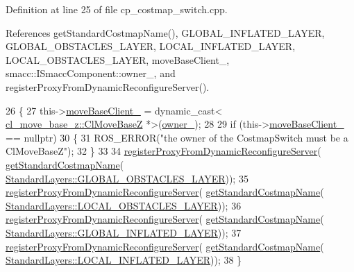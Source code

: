 Definition at line 25 of file cp\+\_\+costmap\+\_\+switch.\+cpp.



References get\+Standard\+Costmap\+Name(), G\+L\+O\+B\+A\+L\+\_\+\+I\+N\+F\+L\+A\+T\+E\+D\+\_\+\+L\+A\+Y\+ER, G\+L\+O\+B\+A\+L\+\_\+\+O\+B\+S\+T\+A\+C\+L\+E\+S\+\_\+\+L\+A\+Y\+ER, L\+O\+C\+A\+L\+\_\+\+I\+N\+F\+L\+A\+T\+E\+D\+\_\+\+L\+A\+Y\+ER, L\+O\+C\+A\+L\+\_\+\+O\+B\+S\+T\+A\+C\+L\+E\+S\+\_\+\+L\+A\+Y\+ER, move\+Base\+Client\+\_\+, smacc\+::\+I\+Smacc\+Component\+::owner\+\_\+, and register\+Proxy\+From\+Dynamic\+Reconfigure\+Server().


\begin{DoxyCode}
26 \{
27     this->\hyperlink{classcl__move__base__z_1_1CostmapSwitch_acf03e8e1bb0ce2117b1a081ed0d073dd}{moveBaseClient\_} = \textcolor{keyword}{dynamic\_cast<}
      \hyperlink{classcl__move__base__z_1_1ClMoveBaseZ}{cl\_move\_base\_z::ClMoveBaseZ} *\textcolor{keyword}{>}(\hyperlink{classsmacc_1_1ISmaccComponent_a909590e672450ce0eb0d8facb45c737a}{owner\_});
28 
29     \textcolor{keywordflow}{if} (this->\hyperlink{classcl__move__base__z_1_1CostmapSwitch_acf03e8e1bb0ce2117b1a081ed0d073dd}{moveBaseClient\_} == \textcolor{keyword}{nullptr})
30     \{
31         ROS\_ERROR(\textcolor{stringliteral}{"the owner of the CostmapSwitch must be a ClMoveBaseZ"});
32     \}
33 
34     \hyperlink{classcl__move__base__z_1_1CostmapSwitch_a0d04ca7b655f850ba3107393f1c437cb}{registerProxyFromDynamicReconfigureServer}(
      \hyperlink{classcl__move__base__z_1_1CostmapSwitch_ac46796874242fdaa7efef86b66a55102}{getStandardCostmapName}(
      \hyperlink{classcl__move__base__z_1_1CostmapSwitch_af38aeee5e3893e689cd74ddddfe0df15a94404229e09ab748aab0096bd5ff3656}{StandardLayers::GLOBAL\_OBSTACLES\_LAYER}));
35     \hyperlink{classcl__move__base__z_1_1CostmapSwitch_a0d04ca7b655f850ba3107393f1c437cb}{registerProxyFromDynamicReconfigureServer}(
      \hyperlink{classcl__move__base__z_1_1CostmapSwitch_ac46796874242fdaa7efef86b66a55102}{getStandardCostmapName}(
      \hyperlink{classcl__move__base__z_1_1CostmapSwitch_af38aeee5e3893e689cd74ddddfe0df15aff8d30cf6ceac8551691e28c328aebe6}{StandardLayers::LOCAL\_OBSTACLES\_LAYER}));
36     \hyperlink{classcl__move__base__z_1_1CostmapSwitch_a0d04ca7b655f850ba3107393f1c437cb}{registerProxyFromDynamicReconfigureServer}(
      \hyperlink{classcl__move__base__z_1_1CostmapSwitch_ac46796874242fdaa7efef86b66a55102}{getStandardCostmapName}(
      \hyperlink{classcl__move__base__z_1_1CostmapSwitch_af38aeee5e3893e689cd74ddddfe0df15a1757575ee674622adfb325de182a65d6}{StandardLayers::GLOBAL\_INFLATED\_LAYER}));
37     \hyperlink{classcl__move__base__z_1_1CostmapSwitch_a0d04ca7b655f850ba3107393f1c437cb}{registerProxyFromDynamicReconfigureServer}(
      \hyperlink{classcl__move__base__z_1_1CostmapSwitch_ac46796874242fdaa7efef86b66a55102}{getStandardCostmapName}(
      \hyperlink{classcl__move__base__z_1_1CostmapSwitch_af38aeee5e3893e689cd74ddddfe0df15aab9e94e9dc4c62e74e48ee34b11c8807}{StandardLayers::LOCAL\_INFLATED\_LAYER}));
38 \}
\end{DoxyCode}
